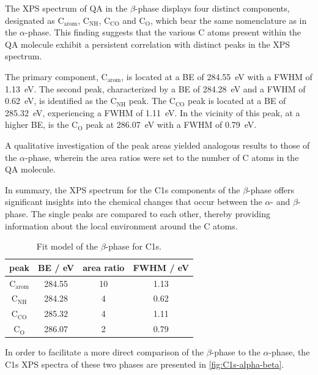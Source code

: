 The \ac{XPS} spectrum of \ac{QA} in the $\beta$-phase displays four distinct components, designated as $\mathrm{C_{arom}}$, $\mathrm{C_{NH}}$, $\mathrm{C_{CO}}$ and $\mathrm{C_{O}}$, which bear the same nomenclature as in the $\alpha$-phase. This finding suggests that the various C atoms present within the \ac{QA} molecule exhibit a persistent correlation with distinct peaks in the \ac{XPS} spectrum.

The primary component, $\mathrm{C_{arom}}$, is located at a \ac{BE} of 284.55~\si{\eV} with a \ac{FWHM} of 1.13~\si{\eV}. The second peak, characterized by a \ac{BE} of 284.28~\si{\eV} and a \ac{FWHM} of 0.62~\si{\eV}, is identified as the $\mathrm{C_{NH}}$ peak. The $\mathrm{C_{CO}}$ peak is located at a \ac{BE} of 285.32~\si{\eV}, experiencing a \ac{FWHM} of 1.11~\si{\eV}. In the vicinity of this peak, at a higher \ac{BE}, is the $\mathrm{C_{O}}$ peak at 286.07~\si{\eV} with a \ac{FWHM} of 0.79~\si{\eV}.

A qualitative investigation of the peak areas yielded analogous results to those of the $\alpha$-phase, wherein the area ratios were set to the number of C atoms in the \ac{QA} molecule.

In summary, the \ac{XPS} spectrum for the C1s components of the $\beta$-phase offers significant insights into the chemical changes that occur between the $\alpha$- and $\beta$-phase. The single peaks are compared to each other, thereby providing information about the local environment around the C atoms.

\begin{table}[H]
	\centering
	\caption{Fit model of the $\beta$-phase for C1s.}
	\begin{tabular}{@{}cccc@{}} \toprule
		peak & \ac{BE} / eV & area ratio & FWHM / eV \\
		\midrule
		$\mathrm{C_{arom}}$ & 284.55 & 10 & 1.13 \\
		$\mathrm{C_{NH}}$ & 284.28 & 4 & 0.62 \\ 
		$\mathrm{C_{CO}}$ & 285.32 & 4 & 1.11 \\
		$\mathrm{C_{O}}$ & 286.07 & 2 & 0.79 \\
		\bottomrule
	\end{tabular}
	\label{tab:C1s-beta-fit}
\end{table}

In order to facilitate a more direct comparison of the $\beta$-phase to the $\alpha$-phase, the C1s \ac{XPS} spectra of these two phases are presented in \autoref{fig:C1s-alpha-beta}.

